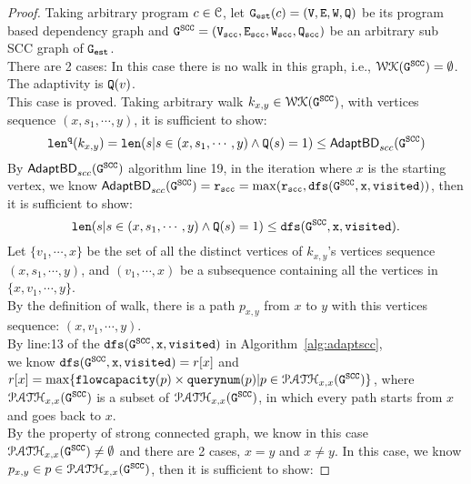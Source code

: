 \begin{proof}
  Taking arbitrary program $c \in \mathcal{C}$, let $\mathtt{{G_{est}}}(c) = (\mathtt{V}, \mathtt{E}, \mathtt{W}, \mathtt{Q})$ be its 
  program based dependency graph and $\mathtt{G^{SCC}} = (\mathtt{{V_{scc}}}, \mathtt{{E_{scc}}}, \mathtt{{W_{scc}}}, \mathtt{{Q_{scc}}})$ be an arbitrary sub SCC graph of $\mathtt{{G_{est}}}$.
  \\
There are 2 cases:
%
In this case there is no walk in this graph, i.e., $\mathcal{WK}(\mathtt{G^{SCC}}) = \emptyset$.
\\
The adaptivity is $\mathtt{Q}(v)$.
\\
This case is proved.
%
  Taking arbitrary walk $k_{x,y} \in \mathcal{WK}{(\mathtt{G^{SCC}}})$, with vertices sequence
  $(x, s_1, \cdots, y)$, it is sufficient to show:
  \[
    \mathtt{len}^{\tt q}(k_{x,y}) = \mathtt{len}(s | s \in (x, s_1, \cdots, y) \land \mathtt{Q}(s) = 1) \leq \mathsf{AdaptBD}_{scc}(\mathtt{G^{SCC}})
  \]
  By $\mathsf{AdaptBD}_{scc}(\mathtt{G^{SCC}})$ algorithm line 19, in the iteration where $x$ is the starting vertex,
  we know $\mathsf{AdaptBD}_{scc}(\mathtt{G^{SCC}}) = \mathtt{r_{scc}} = \max(\mathtt{r_{scc}, \mathtt{dfs(\mathtt{G^{SCC}}, x, visited)}})$,
  then it is sufficient to show:
  $$
  \mathtt{len}(s | s \in (x, s_1, \cdots, y) \land \mathtt{Q}(s) = 1) \leq \mathtt{dfs(\mathtt{G^{SCC}}, x, visited)}.
  $$
  Let  $\{v_1, \cdots, x\}$ be the set of all the distinct vertices of $k_{x,y}$'s vertices sequence $(x, s_1, \cdots, y)$, and 
  $(v_1, \cdots, x)$ be a subsequence containing all the vertices in $\{x, v_1, \cdots, y\}$.
  \\
  By the definition of walk,
 there  is a path $p_{x,y} $ from $x$ to $y$ with this vertices sequence: $(x, v_1, \cdots, y)$.
  \\
  By line:13 of the $\mathtt{dfs(\mathtt{G^{SCC}}, x, visited)}$ in Algorithm~\ref{alg:adaptscc},
  \\
  we know $\mathtt{dfs(\mathtt{G^{SCC}}, x, visited)} = r[x]$ and
  $r[x] = \max\{\mathtt{flowcapacity}(p) \times \mathtt{querynum}(p) | p \in \mathcal{PATH}_{x,x}(\mathtt{G^{SCC}})\}$,
  where $\mathcal{PATH}_{x,x}(\mathtt{G^{SCC}})$ is a subset of $\mathcal{PATH}_{x,x}(\mathtt{G^{SCC}})$, in which every path starts from $x$ and goes back to $x$.
  \\
  By the property of strong connected graph, we know in this case  $\mathcal{PATH}_{x,x}(\mathtt{G^{SCC}}) \neq \emptyset$ and there are 2 cases, $x = y$ and $x \neq y$.
  In this case, we know $p_{x, y} \in p \in \mathcal{PATH}_{x,x}(\mathtt{G^{SCC}})$,  then it is sufficient to show: 

\end{proof}
